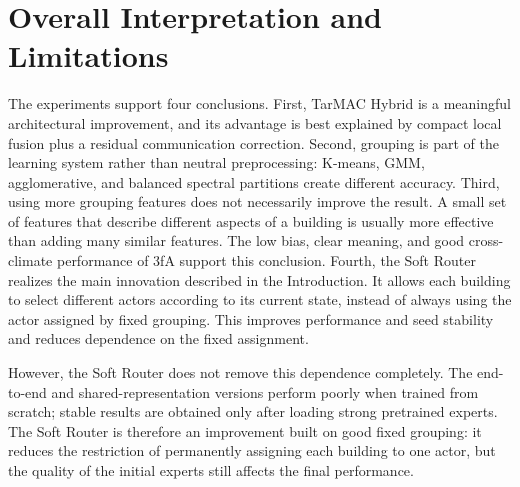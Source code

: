 \section{Overall Interpretation and Limitations}

The experiments support four conclusions. First, TarMAC Hybrid is a meaningful
architectural improvement, and its advantage is best explained by compact local
fusion plus a residual communication correction. Second, grouping is part of
the learning system rather than neutral preprocessing: K-means, GMM,
agglomerative, and balanced spectral partitions create different accuracy.
Third, using more grouping features does not necessarily improve the result. A
small set of features that describe different aspects of a building is usually
more effective than adding many similar features. The low bias, clear meaning,
and good cross-climate performance of 3fA support this conclusion. Fourth, the
Soft Router realizes the main innovation described in the Introduction. It
allows each building to select different actors according to its current state,
instead of always using the actor assigned by fixed grouping. This improves
performance and seed stability and reduces dependence on the fixed assignment.

However, the Soft Router does not remove this dependence completely. The
end-to-end and shared-representation versions perform poorly when trained from
scratch; stable results are obtained only after loading strong pretrained
experts. The Soft Router is therefore an improvement built on good fixed
grouping: it reduces the restriction of permanently assigning each building to
one actor, but the quality of the initial experts still affects the final
performance.
